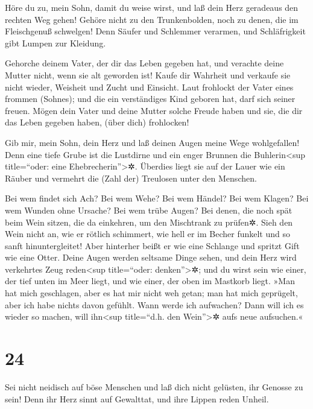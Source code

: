 Höre du zu, mein Sohn, damit du weise wirst, und laß dein
Herz geradeaus den rechten Weg gehen! Gehöre nicht zu den
Trunkenbolden, noch zu denen, die im Fleischgenuß schwelgen!
Denn Säufer und Schlemmer verarmen, und Schläfrigkeit
gibt Lumpen zur Kleidung.

Gehorche deinem Vater, der dir das Leben gegeben hat, und
verachte deine Mutter nicht, wenn sie alt geworden ist!
Kaufe dir Wahrheit und verkaufe sie nicht wieder,
Weisheit und Zucht und Einsicht. Laut frohlockt der Vater
eines frommen (Sohnes); und die ein verständiges Kind geboren hat, darf
sich seiner freuen. Mögen dein Vater und deine Mutter
solche Freude haben und sie, die dir das Leben gegeben haben, (über
dich) frohlocken!

Gib mir, mein Sohn, dein Herz und laß deinen Augen meine
Wege wohlgefallen! Denn eine tiefe Grube ist die
Lustdirne und ein enger Brunnen die Buhlerin\textless sup title=``oder:
eine Ehebrecherin''\textgreater✲. Überdies liegt sie auf
der Lauer wie ein Räuber und vermehrt die (Zahl der) Treulosen unter den
Menschen.

Bei wem findet sich Ach? Bei wem Wehe? Bei wem Händel?
Bei wem Klagen? Bei wem Wunden ohne Ursache? Bei wem trübe Augen?
Bei denen, die noch spät beim Wein sitzen, die da
einkehren, um den Mischtrank zu prüfen✲. Sieh den Wein
nicht an, wie er rötlich schimmert, wie hell er im Becher funkelt und so
sanft hinuntergleitet! Aber hinterher beißt er wie eine
Schlange und spritzt Gift wie eine Otter. Deine Augen
werden seltsame Dinge sehen, und dein Herz wird verkehrtes Zeug
reden\textless sup title=``oder: denken''\textgreater✲;
und du wirst sein wie einer, der tief unten im Meer
liegt, und wie einer, der oben im Mastkorb liegt. »Man
hat mich geschlagen, aber es hat mir nicht weh getan; man hat mich
geprügelt, aber ich habe nichts davon gefühlt. Wann werde ich aufwachen?
Dann will ich es wieder so machen, will ihn\textless sup title=``d.h.
den Wein''\textgreater✲ aufs neue aufsuchen.«

\hypertarget{section-23}{%
\section{24}\label{section-23}}

Sei nicht neidisch auf böse Menschen und laß dich nicht
gelüsten, ihr Genosse zu sein! Denn ihr Herz sinnt auf
Gewalttat, und ihre Lippen reden Unheil.

